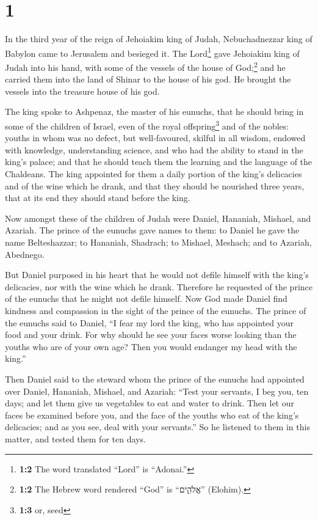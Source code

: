 \hypertarget{section}{%
\section{1}\label{section}}

 In the third year of the reign of Jehoiakim king of
Judah, Nebuchadnezzar king of Babylon came to Jerusalem and besieged it.
 The Lord\footnote{\textbf{1:2} The word translated
  ``Lord'' is ``Adonai.''} gave Jehoiakim king of Judah into his hand,
with some of the vessels of the house of God;\footnote{\textbf{1:2} The
  Hebrew word rendered ``God'' is ``אֱלֹהִ֑ים'' (Elohim).} and he
carried them into the land of Shinar to the house of his god. He brought
the vessels into the treasure house of his god.

 The king spoke to Ashpenaz, the master of his eunuchs,
that he should bring in some of the children of Israel, even of the
royal offspring\footnote{\textbf{1:3} or, seed} and of the nobles:
 youths in whom was no defect, but well-favoured, skilful
in all wisdom, endowed with knowledge, understanding science, and who
had the ability to stand in the king's palace; and that he should teach
them the learning and the language of the Chaldeans.  The
king appointed for them a daily portion of the king's delicacies and of
the wine which he drank, and that they should be nourished three years,
that at its end they should stand before the king.

 Now amongst these of the children of Judah were Daniel,
Hananiah, Mishael, and Azariah.  The prince of the eunuchs
gave names to them: to Daniel he gave the name Belteshazzar; to
Hananiah, Shadrach; to Mishael, Meshach; and to Azariah, Abednego.

 But Daniel purposed in his heart that he would not defile
himself with the king's delicacies, nor with the wine which he drank.
Therefore he requested of the prince of the eunuchs that he might not
defile himself.  Now God made Daniel find kindness and
compassion in the sight of the prince of the eunuchs. 
The prince of the eunuchs said to Daniel, ``I fear my lord the king, who
has appointed your food and your drink. For why should he see your faces
worse looking than the youths who are of your own age? Then you would
endanger my head with the king.''

 Then Daniel said to the steward whom the prince of the
eunuchs had appointed over Daniel, Hananiah, Mishael, and Azariah:
 ``Test your servants, I beg you, ten days; and let them
give us vegetables to eat and water to drink.  Then let
our faces be examined before you, and the face of the youths who eat of
the king's delicacies; and as you see, deal with your servants.''
 So he listened to them in this matter, and tested them
for ten days.

